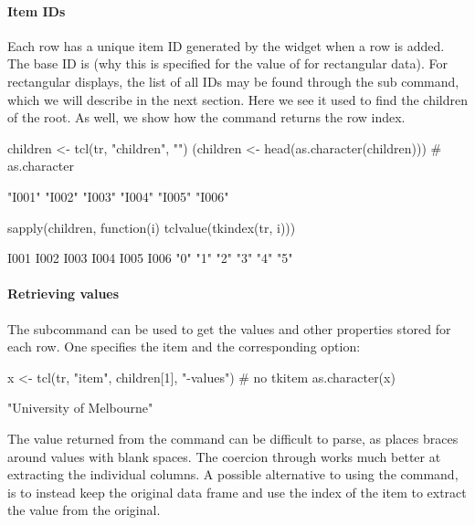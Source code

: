 \paragraph{Item IDs}
Each row has a unique item ID generated by the widget when a row is
added. The base ID is \qcode{} (why this is specified for the value of
 for rectangular data). For rectangular displays, the
list of all IDs may be found through the 
sub command, which we will describe in the next section.  Here we see
it used to find the children of the root. As well, we show how the
 command returns the row index.
\begin{Schunk}
\begin{Sinput}
 children <- tcl(tr, "children", "")
 (children <- head(as.character(children)))     # as.character
\end{Sinput}
\begin{Soutput}
[1] "I001" "I002" "I003" "I004" "I005" "I006"
\end{Soutput}
\begin{Sinput}
 sapply(children, function(i) tclvalue(tkindex(tr, i)))
\end{Sinput}
\begin{Soutput}
I001 I002 I003 I004 I005 I006 
 "0"  "1"  "2"  "3"  "4"  "5" 
\end{Soutput}
\end{Schunk}

\paragraph{Retrieving values}
The  subcommand can be used to get the
values and other properties stored for each row. One specifies the item and the
corresponding option:
\begin{Schunk}
\begin{Sinput}
 x <- tcl(tr, "item", children[1], "-values") # no tkitem
 as.character(x)
\end{Sinput}
\begin{Soutput}
[1] "University of Melbourne"
\end{Soutput}
\end{Schunk}
%
The value returned from the  command can be difficult to
parse, as \TCL\/ places braces around values with blank spaces. The coercion through
 works much better at extracting the individual
columns. A possible alternative to using the  command, is
to instead keep the original data frame and use the index of the item
to extract the value from the original.

